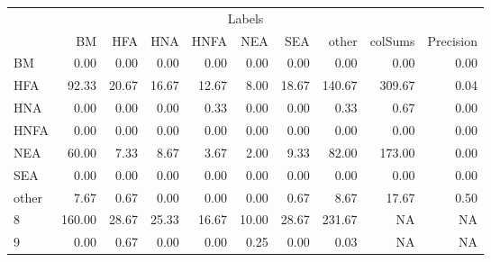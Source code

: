 \begin{table}
\centering\begingroup\fontsize{11}{13}\selectfont

\begin{tabular}{lrrrrrr>{}r|rr}
\toprule
\multicolumn{10}{c}{Labels} \\
\cmidrule(l{3pt}r{3pt}){1-10}
  & BM & HFA & HNA & HNFA & NEA & SEA & other & colSums & Precision\\
\midrule
BM & 0.00 & 0.00 & 0.00 & 0.00 & 0.00 & 0.00 & 0.00 & 0.00 & 0.00\\
HFA & 92.33 & 20.67 & 16.67 & 12.67 & 8.00 & 18.67 & 140.67 & 309.67 & 0.04\\
HNA & 0.00 & 0.00 & 0.00 & 0.33 & 0.00 & 0.00 & 0.33 & 0.67 & 0.00\\
HNFA & 0.00 & 0.00 & 0.00 & 0.00 & 0.00 & 0.00 & 0.00 & 0.00 & 0.00\\
NEA & 60.00 & 7.33 & 8.67 & 3.67 & 2.00 & 9.33 & 82.00 & 173.00 & 0.00\\
\addlinespace
SEA & 0.00 & 0.00 & 0.00 & 0.00 & 0.00 & 0.00 & 0.00 & 0.00 & 0.00\\
other & 7.67 & 0.67 & 0.00 & 0.00 & 0.00 & 0.67 & 8.67 & 17.67 & 0.50\\
8 & 160.00 & 28.67 & 25.33 & 16.67 & 10.00 & 28.67 & 231.67 & NA & NA\\
9 & 0.00 & 0.67 & 0.00 & 0.00 & 0.25 & 0.00 & 0.03 & NA & NA\\
\bottomrule
\end{tabular}
\endgroup{}
\end{table}
